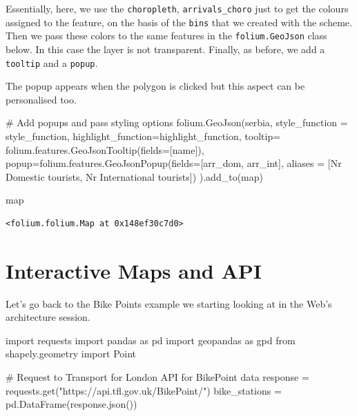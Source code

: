 \documentclass[
  letterpaper,
  DIV=11,
  numbers=noendperiod]{scrreprt}
\newenvironment{Shaded}{\begin{snugshade}}{\end{snugshade}}
\newcommand{\BuiltInTok}[1]{\textcolor[rgb]{0.00,0.23,0.31}{#1}}
\newcommand{\CommentTok}[1]{\textcolor[rgb]{0.37,0.37,0.37}{#1}}
\newcommand{\ImportTok}[1]{\textcolor[rgb]{0.00,0.46,0.62}{#1}}
\newcommand{\NormalTok}[1]{\textcolor[rgb]{0.00,0.23,0.31}{#1}}
\newcommand{\OperatorTok}[1]{\textcolor[rgb]{0.37,0.37,0.37}{#1}}
\newcommand{\StringTok}[1]{\textcolor[rgb]{0.13,0.47,0.30}{#1}}
\begin{document}
Essentially, here, we use the \texttt{choropleth},
\texttt{arrivals\_choro} just to get the colours assigned to the
feature, on the basis of the \texttt{bins} that we created with the
scheme. Then we pass these colors to the same features in the
\texttt{folium.GeoJson} class below. In this case the layer is not
transparent. Finally, as before, we add a \texttt{tooltip} and a
\texttt{popup}.

The popup appears when the polygon is clicked but this aspect can be
personalised too.

\begin{Shaded}
\begin{Highlighting}[]
\CommentTok{\# Add popups and pass styling options}
\NormalTok{folium.GeoJson(serbia, style\_function }\OperatorTok{=}\NormalTok{ style\_function, }
\NormalTok{               highlight\_function}\OperatorTok{=}\NormalTok{highlight\_function, }
\NormalTok{               tooltip}\OperatorTok{=}\NormalTok{ folium.features.GeoJsonTooltip(fields}\OperatorTok{=}\NormalTok{[}\StringTok{\textquotesingle{}name\textquotesingle{}}\NormalTok{]), }
\NormalTok{               popup}\OperatorTok{=}\NormalTok{folium.features.GeoJsonPopup(fields}\OperatorTok{=}\NormalTok{[}\StringTok{\textquotesingle{}arr\_dom\textquotesingle{}}\NormalTok{, }\StringTok{\textquotesingle{}arr\_int\textquotesingle{}}\NormalTok{], aliases }\OperatorTok{=}\NormalTok{ [}\StringTok{\textquotesingle{}Nr Domestic tourists\textquotesingle{}}\NormalTok{, }\StringTok{\textquotesingle{}Nr International tourists\textquotesingle{}}\NormalTok{])}
\NormalTok{    ).add\_to(}\BuiltInTok{map}\NormalTok{)}

\BuiltInTok{map}
\end{Highlighting}
\end{Shaded}

\begin{verbatim}
<folium.folium.Map at 0x148ef30c7d0>
\end{verbatim}

\section{Interactive Maps and API}\label{interactive-maps-and-api}

Let's go back to the Bike Points example we starting looking at in the
Web's architecture session.

\begin{Shaded}
\begin{Highlighting}[]
\ImportTok{import}\NormalTok{ requests}
\ImportTok{import}\NormalTok{ pandas }\ImportTok{as}\NormalTok{ pd}
\ImportTok{import}\NormalTok{ geopandas }\ImportTok{as}\NormalTok{ gpd}
\ImportTok{from}\NormalTok{ shapely.geometry }\ImportTok{import}\NormalTok{ Point}

\CommentTok{\# Request to Transport for London API for BikePoint data}
\NormalTok{response }\OperatorTok{=}\NormalTok{ requests.get(}\StringTok{"https://api.tfl.gov.uk/BikePoint/"}\NormalTok{)}
\NormalTok{bike\_stations }\OperatorTok{=}\NormalTok{ pd.DataFrame(response.json())}
\end{Highlighting}
\end{Shaded}
\end{document}
